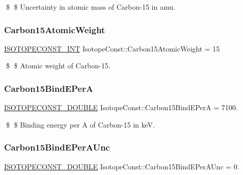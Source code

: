 \$ \$ Uncertainty in atomic mass of Carbon-\/15 in amu. \mbox{\label{group___isotope_const-_carbon-_c15_ga93f80660e07e60bbcaec3e9c3f47d461}} 
\subsubsection{\texorpdfstring{Carbon15\+Atomic\+Weight}{Carbon15AtomicWeight}}
{\footnotesize\ttfamily \mbox{\hyperlink{group___isotope_const-_macros_ga5f18360b3e99483a35c32d789e62621c}{I\+S\+O\+T\+O\+P\+E\+C\+O\+N\+S\+T\+\_\+\+I\+NT}} Isotope\+Const\+::\+Carbon15\+Atomic\+Weight = 15}

\$ \$ Atomic weight of Carbon-\/15. \mbox{\label{group___isotope_const-_carbon-_c15_gaae64e75e642ea25255a2130fb953fca1}} 
\subsubsection{\texorpdfstring{Carbon15\+Bind\+E\+PerA}{Carbon15BindEPerA}}
{\footnotesize\ttfamily \mbox{\hyperlink{group___isotope_const-_macros_ga8f45a7272ce02c0b4c65c44636ed719a}{I\+S\+O\+T\+O\+P\+E\+C\+O\+N\+S\+T\+\_\+\+D\+O\+U\+B\+LE}} Isotope\+Const\+::\+Carbon15\+Bind\+E\+PerA = 7100.}

\$ \$ Binding energy per A of Carbon-\/15 in keV. \mbox{\label{group___isotope_const-_carbon-_c15_ga015975871b8bb4ba326ce0219cae2ceb}} 
\subsubsection{\texorpdfstring{Carbon15\+Bind\+E\+Per\+A\+Unc}{Carbon15BindEPerAUnc}}
{\footnotesize\ttfamily \mbox{\hyperlink{group___isotope_const-_macros_ga8f45a7272ce02c0b4c65c44636ed719a}{I\+S\+O\+T\+O\+P\+E\+C\+O\+N\+S\+T\+\_\+\+D\+O\+U\+B\+LE}} Isotope\+Const\+::\+Carbon15\+Bind\+E\+Per\+A\+Unc = 0.}

